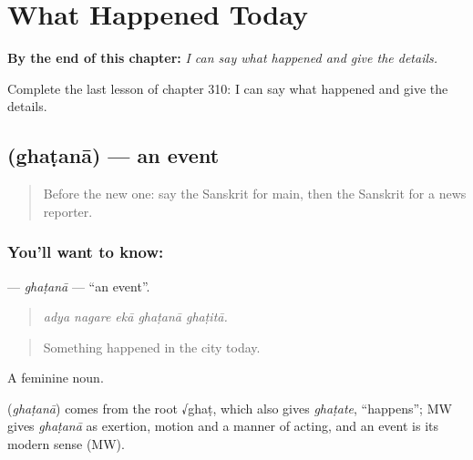 
\chapter{What Happened Today}
\label{ch:sa-what-happened-today}

\begin{chapteropening}
\textbf{By the end of this chapter:} \emph{I can say what happened and give the details.}

Complete the last lesson of chapter 310: I can say what happened and give the details.
\end{chapteropening}

\section[\texorpdfstring{\sk{घटना} (ghaṭanā)}{घटना (ghaṭanā)}]{ (ghaṭanā) — an event}

\label{lesson:SA-C310-ghatana}



\begin{quote}
Before the new one: say the Sanskrit for main, then the Sanskrit for a news reporter.
\end{quote}

\subsection*{You'll want to know: }
\textbf{} — \emph{ghaṭanā} — \textquotedblleft{}an event\textquotedblright{}.

\begin{quote}
    
\end{quote}

\begin{quote}
\emph{adya nagare ekā ghaṭanā ghaṭitā.}
\end{quote}

\begin{quote}
Something happened in the city today.
\end{quote}

A feminine noun.

\begin{cousinweb}
\textbf{} (\emph{ghaṭanā}) comes from the root √ghaṭ, which also gives \emph{ghaṭate}, \textquotedblleft{}happens\textquotedblright{}; MW gives \emph{ghaṭanā} as exertion, motion and a manner of acting, and an event is its modern sense (MW).
\end{cousinweb}

